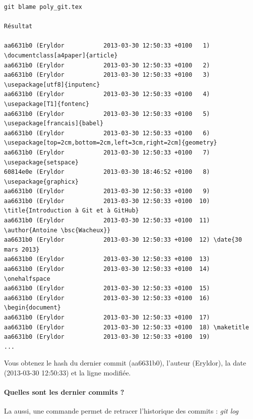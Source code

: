 \documentclass[a4paper]{article}
\begin{document}
\begin{verbatim}
git blame poly_git.tex

Résultat

aa6631b0 (Eryldor           2013-03-30 12:50:33 +0100   1) \documentclass[a4paper]{article}
aa6631b0 (Eryldor           2013-03-30 12:50:33 +0100   2) 
aa6631b0 (Eryldor           2013-03-30 12:50:33 +0100   3) \usepackage[utf8]{inputenc}
aa6631b0 (Eryldor           2013-03-30 12:50:33 +0100   4) \usepackage[T1]{fontenc}
aa6631b0 (Eryldor           2013-03-30 12:50:33 +0100   5) \usepackage[francais]{babel}
aa6631b0 (Eryldor           2013-03-30 12:50:33 +0100   6) \usepackage[top=2cm,bottom=2cm,left=3cm,right=2cm]{geometry}
aa6631b0 (Eryldor           2013-03-30 12:50:33 +0100   7) \usepackage{setspace}
60814e0e (Eryldor           2013-03-30 18:46:52 +0100   8) \usepackage{graphicx}
aa6631b0 (Eryldor           2013-03-30 12:50:33 +0100   9) 
aa6631b0 (Eryldor           2013-03-30 12:50:33 +0100  10) \title{Introduction à Git et à GitHub}
aa6631b0 (Eryldor           2013-03-30 12:50:33 +0100  11) \author{Antoine \bsc{Wacheux}}
aa6631b0 (Eryldor           2013-03-30 12:50:33 +0100  12) \date{30 mars 2013}
aa6631b0 (Eryldor           2013-03-30 12:50:33 +0100  13) 
aa6631b0 (Eryldor           2013-03-30 12:50:33 +0100  14) \onehalfspace
aa6631b0 (Eryldor           2013-03-30 12:50:33 +0100  15) 
aa6631b0 (Eryldor           2013-03-30 12:50:33 +0100  16) \begin{document}
aa6631b0 (Eryldor           2013-03-30 12:50:33 +0100  17) 
aa6631b0 (Eryldor           2013-03-30 12:50:33 +0100  18) \maketitle
aa6631b0 (Eryldor           2013-03-30 12:50:33 +0100  19) 
...
\end{verbatim}

Vous obtenez le hash du dernier commit (aa6631b0), l'auteur (Eryldor), la date (2013-03-30 12:50:33) et la ligne modifiée.

\paragraph{Quelles sont les dernier commits ?}

La aussi, une commande permet de retracer l'historique des commits : \emph{git log}
\end{document}
